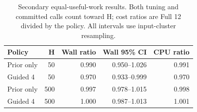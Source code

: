 \begin{table}[t]
\centering\small
\caption{Secondary equal-useful-work results. Both tuning and committed calls count toward H; cost ratios are Full 12 divided by the policy. All intervals use input-cluster resampling.}
\label{tab:insitu}
\begin{tabular}{lrrrr}
\hline
Policy & H & Wall ratio & Wall 95\% CI & CPU ratio\\
\hline
Prior only & 50 & 0.990 & 0.950--1.026 & 0.991 \\
Guided 4 & 50 & 0.970 & 0.933--0.999 & 0.970 \\
Prior only & 500 & 0.997 & 0.978--1.015 & 0.998 \\
Guided 4 & 500 & 1.000 & 0.987--1.013 & 1.001 \\
\hline
\end{tabular}
\end{table}
